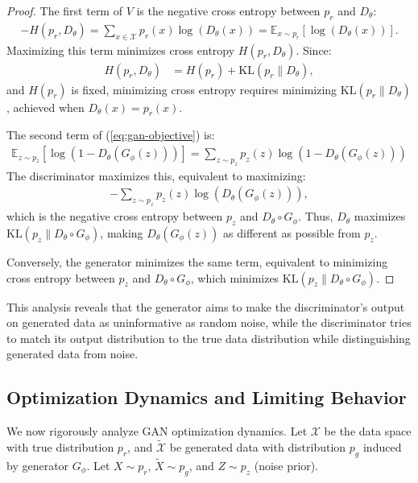 \begin{proof}
  The first term of $V$ is the negative cross entropy between $p_r$ and $D_\theta$:
\begin{align}
  \label{eq:neg-cross-entropy}
  - H(p_r, D_\theta) = \sum_{x \in \mathcal{X}} p_r(x)\log(D_\theta(x)) = \mathbb{E}_{x \sim p_r} [\log(D_\theta(x))].
\end{align}
Maximizing this term minimizes cross entropy $H(p_r, D_\theta)$. Since:
\begin{align}
  H(p_r, D_\theta) & = H(p_r) + \text{KL}(p_r \| D_\theta),
\end{align}
and $H(p_r)$ is fixed, minimizing cross entropy requires minimizing $\text{KL}(p_r \| D_\theta)$, achieved when $D_\theta(x) = p_r(x)$.

The second term of (\ref{eq:gan-objective}) is:
\begin{align}
  \mathbb{E}_{z \sim p_z}[\log(1 - D_\theta(G_\phi(z)))] = \sum_{z \sim p_z} p_z(z) \log (1 - D_\theta(G_\phi(z)))
\end{align}
The discriminator maximizes this, equivalent to maximizing:
\begin{align}
  -\sum_{z \sim p_z} p_z(z) \log (D_\theta(G_\phi(z))),
\end{align}
which is the negative cross entropy between $p_z$ and $D_\theta \circ G_\phi$. Thus, $D_\theta$ maximizes $\text{KL}(p_z \| D_\theta \circ G_\phi)$, making $D_\theta(G_\phi(z))$ as different as possible from $p_z$.

Conversely, the generator minimizes the same term, equivalent to minimizing cross entropy between $p_z$ and $D_\theta \circ G_\phi$, which minimizes $\text{KL}(p_z \| D_\theta \circ G_\phi)$.
\end{proof}

This analysis reveals that the generator aims to make the discriminator's output on generated data as uninformative as random noise, while the discriminator tries to match its output distribution to the true data distribution while distinguishing generated data from noise.

\subsection{Optimization Dynamics and Limiting Behavior}%
\label{sec:optimization-dynamics}%

We now rigorously analyze GAN optimization dynamics. Let $\mathcal{X}$ be the data space with true distribution $p_r$, and $\tilde{\mathcal{X}}$ be generated data with distribution $p_g$ induced by generator $G_\phi$. Let $X \sim p_r$, $\tilde{X} \sim p_g$, and $Z \sim p_z$ (noise prior).

